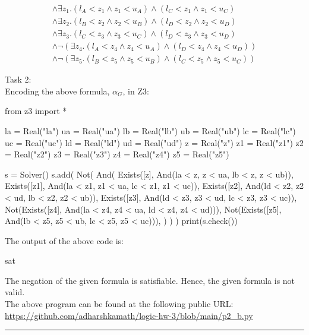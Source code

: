 \documentclass[12pt,letterpaper, onecolumn]{exam}
\newcommand{\link}[1]{{\color{blue}\href{#1}{#1}}}
\begin{document}
\begin{questions}
\begin{align*}
		\land \exists z_1. (l_{A} < z_1 \land z_1 < u_{A}) \land (l_{C} < z_1 \land z_1 < u_{C}) \\
		\land \exists z_2. (l_{B} < z_2 \land z_2 < u_{B}) \land (l_{D} < z_2 \land z_2 < u_{D}) \\
		\land \exists z_3. (l_{C} < z_3 \land z_3 < u_{C}) \land (l_{D} < z_3 \land z_3 < u_{D}) \\
		\land \neg (\exists z_4. (l_{A} < z_4 \land z_4 < u_{A}) \land (l_{D} < z_4 \land z_4 < u_{D})) \\
		\land \neg (\exists z_5. (l_{B} < z_5 \land z_5 < u_{B}) \land (l_{C} < z_5 \land z_5 < u_{C}))
	\end{align*}
	
	Task 2: \\
	Encoding the above formula, $\alpha_G$, in Z3:
	\begin{python}
from z3 import *

la = Real("la")
ua = Real("ua")
lb = Real("lb")
ub = Real("ub")
lc = Real("lc")
uc = Real("uc")
ld = Real("ld")
ud = Real("ud")
z = Real("z")
z1 = Real("z1")
z2 = Real("z2")
z3 = Real("z3")
z4 = Real("z4")
z5 = Real("z5")

s = Solver()
s.add(
	Not(
		And(
			Exists([z], And(la < z, z < ua, lb < z, z < ub)),
			Exists([z1], And(la < z1, z1 < ua, lc < z1, z1 < uc)),
			Exists([z2], And(ld < z2, z2 < ud, lb < z2, z2 < ub)),
			Exists([z3], And(ld < z3, z3 < ud, lc < z3, z3 < uc)),
			Not(Exists([z4], And(la < z4, z4 < ua, ld < z4, z4 < ud))),
			Not(Exists([z5], And(lb < z5, z5 < ub, lc < z5, z5 < uc))),
		)
	)
)
print(s.check())
	\end{python}
	The output of the above code is:
	\begin{python}
sat
	\end{python}
	The negation of the given formula is satisfiable. Hence, the given formula is not valid. \\
	The above program can be found at the following public URL: \\
	\link{https://github.com/adharshkamath/logic-hw-3/blob/main/p2\_b.py}

    {\rule{17cm}{0.4pt}}
	\question[]
	\solutiontitle


\end{questions}
\end{document}
